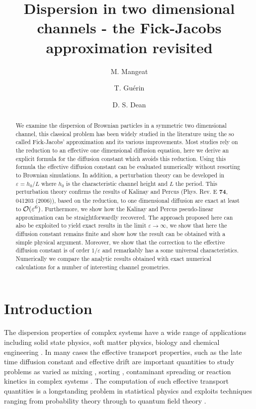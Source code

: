 \documentclass[pre,showpacs,preprintnumbers,amsmath,amssymb,superscriptaddress]{revtex4-1}
\begin{document}
\title{Dispersion in two dimensional channels - the Fick-Jacobs approximation revisited}
\author{M. Mangeat}
\author{T. Gu\'erin}
\author{D. S. Dean}




\begin{abstract}
We examine the dispersion of Brownian particles in a symmetric two dimensional channel, this classical problem has been widely studied in the literature using the so called Fick-Jacobs' 
approximation and its various improvements. Most studies rely on the reduction to an effective one dimensional diffusion equation, here we derive an explicit formula for the diffusion constant 
which avoids this reduction. Using this formula the effective diffusion constant can be evaluated
numerically without resorting to Brownian simulations. In addition, a perturbation theory can be
developed in $\varepsilon = h_0/L$ where $h_0$ is the characteristic channel height and $L$ the period. This perturbation theory confirms the results of Kalinay and Percus (Phys. Rev. E {\bf 74}, 041203 (2006)), based on the reduction, to one dimensional diffusion are exact at least to  ${\cal O}(\varepsilon^6)$. Furthermore, we show how the Kalinay and Percus pseudo-linear approximation can be straightforwardly recovered. The approach proposed here can also be exploited to yield exact results in the limit $\varepsilon \to \infty$, we show that here the diffusion constant remains finite and show how the result can be obtained with a simple physical argument. Moreover, we show that the 
correction to the effective diffusion constant is of order $1/\varepsilon$ and remarkably has a some universal characteristics. Numerically we compare the analytic results obtained with exact numerical calculations for a number of interesting channel geometries.


\end{abstract}

\maketitle
\section{Introduction}
The dispersion properties of complex systems have a wide range of applications including solid state physics, soft matter physics, biology and chemical engineering \cite{van2007,gar1985}. 
In many cases the effective transport properties, such as the late time diffusion constant and effective drift are important quantities to study problems as varied as 
 mixing \cite{leBorgne2013stretching,dentz2011mixing,barros2012flow}, sorting \cite{bernate2012stochastic}, contaminant spreading \cite{brusseau1994transport} or reaction kinetics in complex systems \cite{con2007}. The computation of such effective transport quantities is a longstanding problem in statistical physics and exploits techniques ranging from probability theory \cite{kel1962} through to quantum field theory \cite{dea2007}. 
\end{document}
